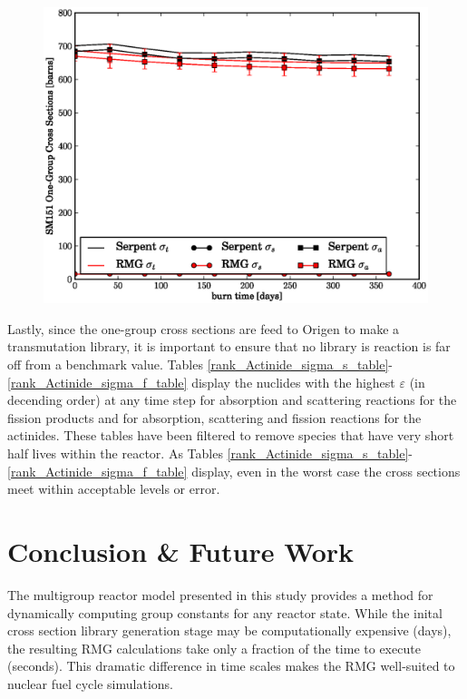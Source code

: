 \begin{figure}[htbp]
\begin{center}
\includegraphics[scale=0.3]{multigroup_method/figs/benchmark/SM151_1g_xs.eps}
\end{center}
\end{figure}

Lastly, since the one-group cross sections are feed to Origen to make a transmutation library, it is important 
to ensure that no library is reaction is far off from a benchmark value.  Tables 
\ref{rank_Actinide_sigma_s_table}-\ref{rank_Actinide_sigma_f_table} display the 
nuclides with the highest $\varepsilon$ (in decending order) at any time step for absorption and scattering
reactions for the fission products and for absorption, scattering and fission reactions for the actinides.
These tables have been filtered to remove species that have very short half lives within the reactor.
As Tables \ref{rank_Actinide_sigma_s_table}-\ref{rank_Actinide_sigma_f_table} display, even in the worst case 
the cross sections meet within acceptable levels or error.








\section{Conclusion \& Future Work}
The multigroup reactor model presented in this study provides a method for dynamically
computing group constants for any reactor state.  While the inital cross section library
generation stage may be computationally expensive (days), the resulting RMG calculations take
only a fraction of the time to execute (seconds).  This dramatic difference in time scales
makes the RMG well-suited to nuclear fuel cycle simulations.

